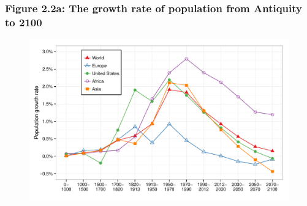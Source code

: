 \documentclass[t]{beamer}\usepackage[]{graphicx}\usepackage[]{color}
\newenvironment{knitrout}{}{} %
\begin{document}
\begin{frame}[label=Figure_2_2a]
\frametitle{Figure 2.2a: The growth rate of population from Antiquity to 2100}
\begin{figure}[t]
\begin{minipage}[b]{\textwidth}
\centering
\begin{knitrout}\footnotesize
{}\color{fgcolor}

{\centering \includegraphics[width=1\linewidth]{figures/color/Figure_2_2a} 

}



\end{knitrout}
\end{minipage}
\end{figure}
\end{frame}
\end{document}
